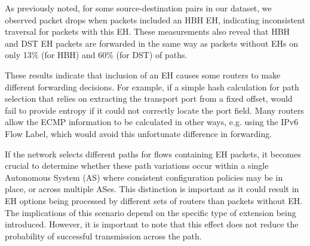 \documentclass[conference]{IEEEtran}
\begin{document}


As previously noted, for some source-destination pairs in our dataset, we
observed packet drops when packets included an HBH EH, indicating
inconsistent traversal for packets with this EH. These measurements also reveal
that HBH and DST EH packets are forwarded in the same way as packets without
EHs on only 13\% (for HBH) and 60\% (for DST) of paths.

These results indicate that inclusion of an EH causes some routers to make
different forwarding decisions.  For example, if a simple hash calculation for
path selection that relies on extracting the transport port from a fixed
offset, would fail to provide entropy if it could not correctly locate the port
field. Many routers allow the ECMP information to be calculated in other ways,
e.g. using the IPv6 Flow Label, which would avoid this unfortunate difference
in forwarding.


If the network selects different paths for flows containing EH packets, it
becomes crucial to determine whether these path variations occur within a
single Autonomous System (AS) where consistent configuration policies may be in
place, or across multiple ASes. This distinction is important as it could
result in EH options being processed by different sets of routers than packets
without EH. The implications of this scenario depend on the specific type of
extension being introduced. However, it is important to note that this effect
does not reduce the probability of successful transmission across the path.


\end{document}
